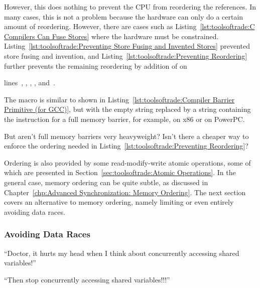 However, this does nothing to prevent the CPU from reordering the
references.
In many cases, this is not a problem because the hardware can only do
a certain amount of reordering.
However, there are cases such as
Listing~\ref{lst:toolsoftrade:C Compilers Can Fuse Stores} where the
hardware must be constrained.
Listing~\ref{lst:toolsoftrade:Preventing Store Fusing and Invented Stores}
prevented store fusing and invention, and
Listing~\ref{lst:toolsoftrade:Preventing Reordering}
further prevents the remaining reordering by addition of
 on
\begin{lineref}
lines~, , , ,
and~.
\end{lineref}
The  macro is similar to  shown in
Listing~\ref{lst:toolsoftrade:Compiler Barrier Primitive (for GCC)},
but with the empty string replaced by a string containing the
instruction for a full memory barrier, for example, 
on x86 or  on PowerPC.

\QuickQuiz{}
	But aren't full memory barriers very heavyweight?
	Isn't there a cheaper way to enforce the ordering needed in
	Listing~\ref{lst:toolsoftrade:Preventing Reordering}?
 \QuickQuizEnd

Ordering is also provided by some read-modify-write atomic
operations, some of which are presented in
Section~\ref{sec:toolsoftrade:Atomic Operations}.
In the general case, memory ordering can be quite subtle, as
discussed in
Chapter~\ref{chp:Advanced Synchronization: Memory Ordering}.
The next section covers an alternative to memory ordering, namely
limiting or even entirely avoiding data races.

\subsubsection{Avoiding Data Races}
\label{sec:toolsoftrade:Avoiding Data Races}

``Doctor, it hurts my head when I think about concurrently accessing
shared variables!''

``Then stop concurrently accessing shared variables!!!''


